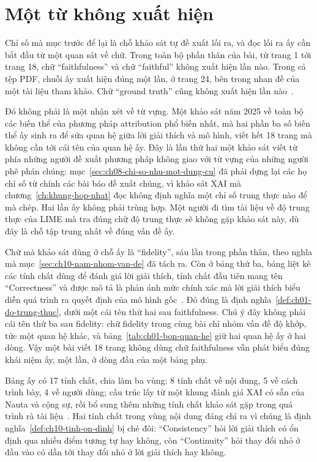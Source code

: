 \section{Một từ không xuất hiện}
\label{sec:ch10-mot-tu-khong-xuat-hien}

%
Chỉ số mà mục trước để lại là chỗ khảo sát tự đề xuất lối ra, và đọc lối ra ấy
cần bắt đầu từ một quan sát về chữ. Trong toàn bộ phần thân của bài, từ trang 1
tới trang 18, chữ \enquote{faithfulness} và chữ \enquote{faithful} không xuất hiện lần
nào. Trong cả tệp PDF, chuỗi ấy xuất hiện đúng một lần, ở trang 24, bên trong
nhan đề của một tài liệu tham khảo. Chữ \enquote{ground truth} cũng không xuất hiện
lần nào~\autocite{p22whichlime}.

Đó không phải là một nhận xét về từ vựng. Một khảo sát năm 2025 về toàn bộ các biến
thể của phương pháp attribution phổ biến nhất, mà hai phần ba số biến thể ấy
sinh ra để sửa quan hệ giữa lời giải thích và mô hình, viết hết 18 trang mà
không cần tới cái tên của quan hệ ấy. Đây là lần thứ hai một khảo sát viết từ
phía những người đề xuất phương pháp không giao với từ vựng của những người
phê phán chúng:
mục~\ref{sec:ch08-chi-so-nhu-mot-dung-cu} đã phải dựng lại các họ chỉ số từ
chính các bài báo đề xuất chúng, vì khảo sát XAI mà
chương~\ref{ch:khung-hop-nhat} đọc không định nghĩa một chỉ số trung thực nào để
mà chép. Hai lần ấy không phải trùng hợp. Một người đi tìm tài liệu về độ trung
thực của LIME mà tra đúng chữ độ trung thực sẽ không gặp khảo sát này, dù đây là
chỗ tập trung nhất về đúng vấn đề ấy.

Chữ mà khảo sát dùng ở chỗ ấy là \enquote{fidelity}, sáu lần trong phần thân, theo
nghĩa mà mục~\ref{sec:ch10-nam-nhom-van-de} đã tách ra. Còn ở bảng thứ ba, bảng
liệt kê các tính chất dùng để đánh giá lời giải thích, tính chất đầu tiên mang
tên \enquote{Correctness} và được mô tả là phản ánh mức chính xác mà lời giải thích
biểu diễn quá trình ra quyết định của mô hình gốc~\autocite{p22whichlime}. Đó
đúng là định nghĩa~\ref{def:ch01-do-trung-thuc}, dưới một cái tên thứ hai sau
faithfulness. Chú ý đây không phải cái tên thứ ba sau fidelity: chữ fidelity
trong cùng bài chỉ nhóm vấn đề độ khớp, tức một quan hệ khác, và
bảng~\ref{tab:ch01-bon-quan-he} giữ hai quan hệ ấy ở hai dòng. Vậy một bài viết
18 trang không dùng chữ faithfulness vẫn phát biểu đúng khái niệm ấy, một lần,
ở dòng đầu của một bảng phụ.

Bảng ấy có 17 tính chất, chia làm ba vùng: 8 tính chất về nội dung, 5 về cách
trình bày, 4 về người dùng; cấu trúc lấy từ một khung đánh giá XAI có sẵn của
Nauta và cộng sự, rồi bổ sung thêm những tính chất khảo sát gặp trong quá trình
rà tài liệu~\autocite{p22whichlime}. Hai tính chất trong vùng nội dung đáng chỉ
ra vì chúng là định nghĩa~\ref{def:ch10-tinh-on-dinh} bị chẻ đôi:
\enquote{Consistency} hỏi lời giải thích có ổn định qua nhiều điểm tương tự hay
không, còn \enquote{Continuity} hỏi thay đổi nhỏ ở đầu vào có dẫn tới thay đổi nhỏ
ở lời giải thích hay không.

